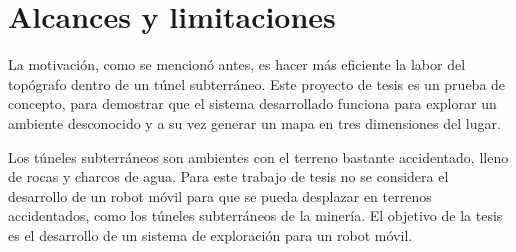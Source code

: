 


\section{Alcances y limitaciones}

La motivación, como se mencionó antes, es hacer más eficiente la labor del topógrafo 
dentro de un túnel subterráneo. Este proyecto de tesis es un prueba de concepto, para 
demostrar que el sistema desarrollado funciona para explorar un ambiente desconocido y 
a su vez generar un mapa en tres dimensiones del lugar.

Los túneles subterráneos son ambientes con el terreno bastante accidentado, lleno de
rocas y charcos de agua. Para este trabajo de tesis no se considera el desarrollo de 
un robot móvil para que se pueda desplazar en terrenos accidentados, como los túneles 
subterráneos de la minería. El objetivo de la tesis es el desarrollo de un sistema 
de exploración para un robot móvil. 

